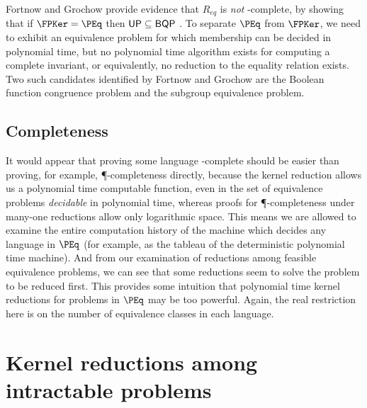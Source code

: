 \documentclass{article}
\theoremstyle{definition} \newtheorem{definition}[definition]{Definition}
\begin{document}
Fortnow and Grochow provide evidence that $R_{eq}$ is \emph{not} \PEq-complete,
by showing that if $\FPKer=\PEq$ then ${\mathsf{UP}}\subseteq{\ensuremath{\mathsf{BQP}}}$ \cite{fg09}. To
separate $\PEq$ from $\FPKer$, we need to exhibit an equivalence problem for
which membership can be decided in polynomial time, but no polynomial time
algorithm exists for computing a complete invariant, or equivalently, no
reduction to the equality relation exists. Two such candidates identified by
Fortnow and Grochow are the Boolean function congruence problem and the
subgroup equivalence problem.


\subsection{Completeness}

It would appear that proving some language \PEq-complete should be easier than
proving, for example, \P-completeness directly, because the kernel reduction
allows us a polynomial time computable function, even in the set of equivalence
problems \emph{decidable} in polynomial time, whereas proofs for
\P-completeness under many-one reductions allow only logarithmic space. This
means we are allowed to examine the entire computation history of the machine
which decides any language in $\PEq$ (for example, as the tableau of the
deterministic polynomial time machine). And from our examination of reductions
among feasible equivalence problems, we can see that some reductions seem to
solve the problem to be reduced first. This provides some intuition that
polynomial time kernel reductions for problems in $\PEq$ may be too
powerful. Again, the real restriction here is on the number of equivalence
classes in each language.



\section{Kernel reductions among intractable problems}
\end{document}
